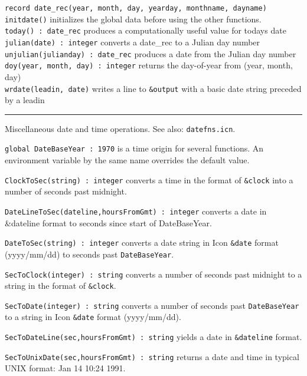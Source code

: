\texttt{record date\_rec(year, month, day, yearday, monthname,
dayname)}\\
\texttt{initdate()} initializes the global data before using the other
functions.\\
\texttt{today() : date\_rec} produces a computationally useful value for
today{\textquotesingle}s date\\
\texttt{julian}\texttt{(date) : integer} converts a
date\_rec to a Julian day number\\
\texttt{unjulian(julianday) : date\_rec} produces a date from the Julian
day number\\
\texttt{doy(year, month, day) : integer} returns the day-of-year from
(year, month, day)\\
\texttt{wrdate(leadin, date)} writes a line to \texttt{\&output} with a
basic date string preceded by a leadin 

\vspace{0.25cm}\hrule{}

Miscellaneous date and time operations. See also: \texttt{datefns.icn}.

\texttt{global DateBaseYear : 1970} is a time origin for several
functions. An environment
variable by the same name overrides the default value.

\texttt{ClockToSec(string) : integer} converts a time in the format of
\texttt{\&clock} into a number of seconds past midnight.

\texttt{DateLineToSec(dateline,hoursFromGmt) : integer} converts a date
in \&dateline format to seconds since start of DateBaseYear.

\texttt{DateToSec(string) : integer} converts a date string in Icon
\texttt{\&date} format (yyyy/mm/dd) to seconds past
\texttt{DateBaseYear}.

\texttt{SecToClock(integer) : string} converts a number of seconds past
midnight to a string in the format of \texttt{\&clock}.

\texttt{SecToDate(integer) : string} converts a number of seconds past
\texttt{DateBaseYear} to a string in Icon \texttt{\&date} format
(yyyy/mm/dd).

\texttt{SecToDateLine(sec,hoursFromGmt) : string} yields a date in
\texttt{\&dateline} format.

\texttt{SecToUnixDate(sec,hoursFromGmt) : string} returns a date and
time in typical UNIX format: Jan 14 10:24 1991.


